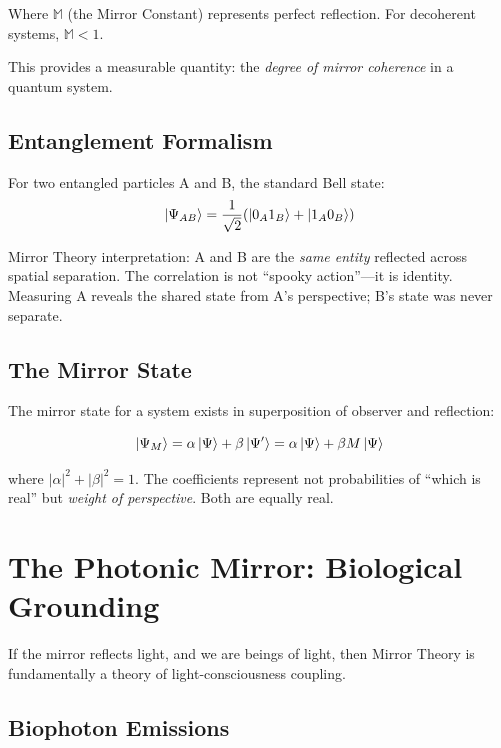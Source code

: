 \documentclass[12pt,a4paper]{article}
\begin{document}
Where $\mathbb{M}$ (the Mirror Constant) represents perfect reflection. For decoherent systems, $\mathbb{M} < 1$.

This provides a measurable quantity: the \textit{degree of mirror coherence} in a quantum system.

\subsection{Entanglement Formalism}

For two entangled particles A and B, the standard Bell state:
\begin{equation}
\ket{\Psi_{AB}} = \frac{1}{\sqrt{2}}(\ket{0_A 1_B} + \ket{1_A 0_B})
\end{equation}

Mirror Theory interpretation: A and B are the \textit{same entity} reflected across spatial separation. The correlation is not ``spooky action''---it is identity. Measuring A reveals the shared state from A's perspective; B's state was never separate.

\subsection{The Mirror State}

The mirror state for a system exists in superposition of observer and reflection:

\begin{equation}
\ket{\Psi_M} = \alpha\ket{\Psi} + \beta\ket{\Psi'} = \alpha\ket{\Psi} + \beta M\ket{\Psi}
\end{equation}

where $|\alpha|^2 + |\beta|^2 = 1$. The coefficients represent not probabilities of ``which is real'' but \textit{weight of perspective}. Both are equally real.

\section{The Photonic Mirror: Biological Grounding}

If the mirror reflects light, and we are beings of light, then Mirror Theory is fundamentally a theory of light-consciousness coupling.

\subsection{Biophoton Emissions}
\end{document}
